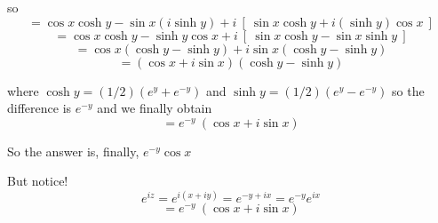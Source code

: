 \documentclass[11pt, oneside]{article}
\begin{document}
so
\[ = \cos x \cosh y - \sin x (i \sinh y) + i \ [ \ \sin x \cosh y + i(\sinh y) \cos x \ ] \]
\[ = \cos x \cosh y -\sinh y \cos x + i \ [ \ \sin x \cosh y - \sin x \sinh y \ ] \]
\[ = \cos x (\cosh y -\sinh y) + i \sin x (\cosh y - \sinh y) \]
\[ = (\cos x + i \sin x) (\cosh y - \sinh y) \]

where $\cosh y = (1/2)(e^y + e^{-y})$ and $\sinh y = (1/2)(e^y - e^{-y})$ so the difference is $e^{-y}$ and we finally obtain
\[ = e^{-y} \ (\cos x + i \sin x)  \]

So the answer is, finally, $e^{-y} \cos x$

But notice!
\[ e^{iz} = e^{i (x + iy)} = e^{-y + ix} = e^{-y} e^{ix}  \]
\[ = e^{-y} \ (\cos x + i \sin x) \]
\end{document}
